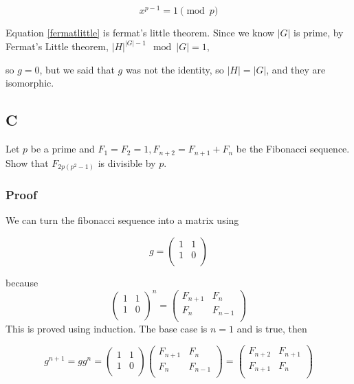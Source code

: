 \documentclass[11pt]{article}
\begin{document}
\begin{equation}
\label{fermatlittle}
x^{p-1} = 1 \pmod p
\end{equation}

Equation \ref{fermatlittle} is fermat's little theorem.
Since we know \(|G|\) is prime, by Fermat's Little theorem, \(|H|^{|G| - 1} \mod |G| = 1\),

so \(g = 0\), but we said that \(g\) was not the identity, so \(|H| = |G|\), and they
are isomorphic.


\subsection{C}
\label{sec:org206d0da}

Let \(p\) be a prime and \(F_1 = F_2 = 1, F_{n+2} = F_{n+1} + F_n\)
 be the Fibonacci sequence. Show that \(F_{2p(p^2-1)}\) is divisible by \(p\).

\subsubsection{Proof}
\label{sec:org1cb701e}
We can turn the fibonacci sequence into a matrix using


\begin{equation}
\label{eq:2}
g =
\begin{pmatrix}
1 & 1 \\
1 & 0 \\
\end{pmatrix}
\end{equation}


because
\begin{equation}
\label{eq:3}
\begin{pmatrix}
1 & 1 \\
1 & 0 \\
\end{pmatrix}^n =
\begin{pmatrix}
F_{n+1} & F_{n} \\
F_n & F_{n -1 }\\
\end{pmatrix}
\end{equation}
This is proved using induction.  The base case is \(n = 1\) and is true, then


\begin{equation}
\label{eq:4}
g^{n + 1} = g g^n = \begin{pmatrix}
1 & 1 \\
1 & 0 \\
\end{pmatrix}
\begin{pmatrix}
F_{n + 1} & F_{n} \\
F_n & F_{n - 1} \\
\end{pmatrix} =
\begin{pmatrix}
F_{n + 2}  & F_{n + 1} \\
F_{n + 1} & F_n \\
\end{pmatrix}
\end{equation}
\end{document}
